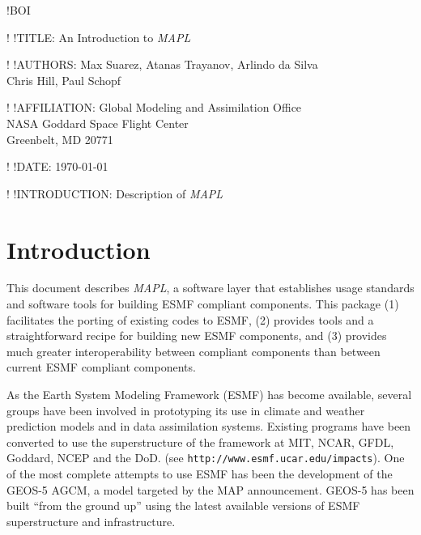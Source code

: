 !BOI

\newcommand{\ggn}{{\em MAPL}}
\newcommand{\bdl}{{\tt ESMF\_Bundle}}
\newcommand{\fld}{{\tt ESMF\_Field}}
\newcommand{\stt}{{\tt ESMF\_State}}
\newcommand{\grd}{{\tt ESMF\_Grid}}
\newcommand{\loc}{{\tt MAPL\_LocationStream}}
\newcommand{\ssv}{{\tt SetServices}}
\newcommand{\egc}{{\tt ESMF\_GriddedComponent}}
\newcommand{\gssv}{{\tt MAPL\_GenericSetServices}}
\newcommand{\gint}{{\tt MAPL\_GenericInitialize}}
\newcommand{\gfin}{{\tt MAPL\_GenericFinalize}}
\newcommand{\ptx}{{\tt protex}}

\setcounter{genct}{1}
\setcounter{grdct}{1}
\setcounter{sttct}{1}

!  !TITLE: An Introduction to  \ggn  

!  !AUTHORS: Max Suarez, Atanas Trayanov, Arlindo da Silva \\ Chris Hill, Paul Schopf 

!  !AFFILIATION: Global Modeling and Assimilation Office \\ NASA Goddard Space Flight Center \\  Greenbelt, MD 20771

!  !DATE: \today

!  !INTRODUCTION: Description of \ggn

\setlength{\parskip}{12pt}



\section{Introduction}

This document describes \ggn, a software layer that
establishes usage standards and
software tools for building ESMF compliant components. This package
(1) facilitates the porting of existing codes to ESMF, (2) provides
tools and a straightforward recipe for building new ESMF components,
and (3) provides much greater interoperability between compliant
components than between current ESMF compliant components.

As the Earth System Modeling Framework (ESMF)
has become available, several groups have been involved in prototyping
its use in climate and weather prediction models and in data
assimilation systems.  Existing programs have been converted to use
the superstructure of the framework at MIT, NCAR, GFDL, Goddard,
NCEP and the DoD. (see {\tt http://www.esmf.ucar.edu/impacts}).
One of the
most complete attempts to use ESMF has been the development of the
GEOS-5 AGCM, a model targeted by the MAP announcement. GEOS-5 has been
built ``from the ground up'' using the latest available versions of
ESMF superstructure and infrastructure.

